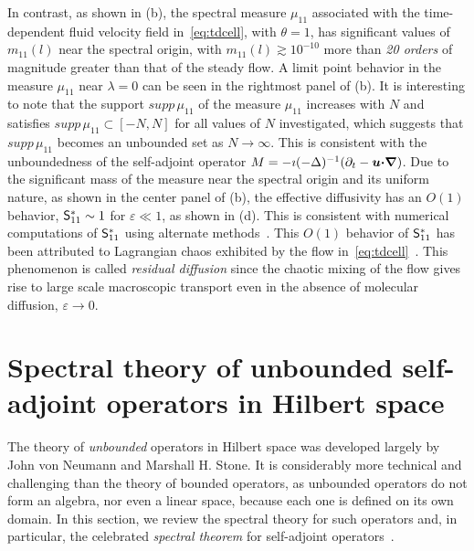 \documentclass[amsa]{ipart}
\begin{document}
In contrast, as shown in (b),
the spectral measure $\mu_{11}$ associated with the time-dependent fluid
velocity field in~\eqref{eq:tdcell}, with $\theta=1$, has significant
values of $m_{11}(l)$ near the spectral origin, with
$m_{11}(l)\gtrsim10^{-10}$ more than \emph{20 orders} of magnitude greater
than  that of the steady flow. A limit point behavior in the measure
$\mu_{11}$ near $\lambda=0$ can be seen in the rightmost panel of
(b).  It is interesting to note
that the support $supp\,\mu_{11}$ of the measure $\mu_{11}$ increases with
$N$ and satisfies
$supp\,\mu_{11}\subset[-N,N]$ for all values of $N$ investigated, which
suggests that $supp\,\mu_{11}$ becomes an unbounded set
as $N\to\infty$. This is consistent with the unboundedness of the
self-adjoint operator $M=-\imath(-\Delta)^{-1}(\partial_t-\boldsymbol{u}\mbox{\boldmath${\cdot}$}\mbox{\boldmath${\nabla}$})$. Due to
the significant mass of the measure 
near the spectral origin and its uniform nature, as shown in the
center panel of 
(b), the effective diffusivity
has an $O(1)$ behavior, $\mathsf{S}^*_{11}\sim1$ for $\varepsilon\ll1$, as shown in
(d). This is consistent with 
numerical computations of $\mathsf{S}^*_{11}$ using alternate 
methods~\cite{Biferale:PF:2725}. This $O(1)$ behavior of $\mathsf{S}^*_{11}$
has been attributed to Lagrangian chaos exhibited by the
flow in~\eqref{eq:tdcell}~\cite{Biferale:PF:2725,ZCX_2015}. This
phenomenon is called \emph{residual diffusion} since the chaotic
mixing of the flow gives rise to large scale macroscopic transport
even in the absence of molecular diffusion, $\varepsilon\to0$. 




  \setcounter{equation}{1}  %
  \setcounter{section}{0}  %
  \renewcommand{\theequation}{A-\arabic{equation}} 
\renewcommand{\thesection}{A-\arabic{section}}

\appendix
%

\section{Spectral theory of unbounded self-adjoint operators in
  Hilbert space} \label{app:Spectral_Theory}    
%
The theory of \emph{unbounded} operators in Hilbert
space was developed largely by John von Neumann and Marshall H. Stone. It
is considerably more technical and challenging than the theory of bounded
operators, as unbounded operators do not form an algebra, nor even a
linear space, because each one is defined on its own domain. In this
section, we review the spectral theory for such operators and, in
particular, the celebrated \emph{spectral theorem} for self-adjoint
operators~\cite{Reed-1980,Stone:64}.
\end{document}
